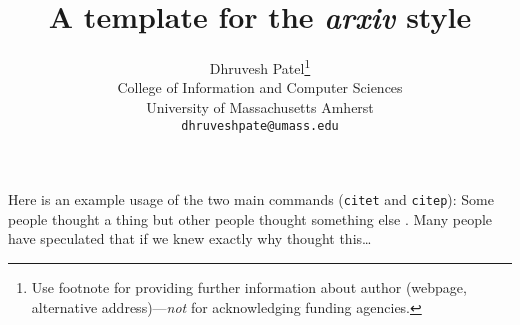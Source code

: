 \documentclass{article}
\title{A template for the \emph{arxiv} style}
\author{ Dhruvesh Patel\thanks{Use footnote for providing further
		information about author (webpage, alternative
		address)---\emph{not} for acknowledging funding agencies.} \\
	College of Information and Computer Sciences\\
	University of Massachusetts Amherst\\
	\texttt{dhruveshpate@umass.edu} \\
}
\begin{document}
\maketitle







Here is an example usage of the two main commands (\verb+citet+ and \verb+citep+): Some people thought a thing \citep{kour2014real, hadash2018estimate} but other people thought something else \citep{kour2014fast}. Many people have speculated that if we knew exactly why \citet{kour2014fast} thought this\dots



\end{document}
